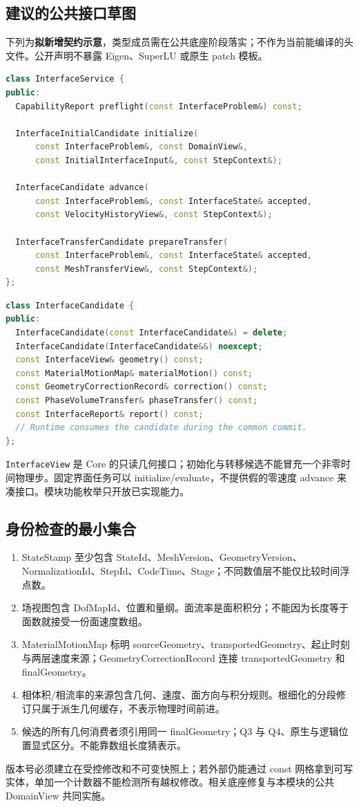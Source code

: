 \documentclass[UTF8,a4paper,11pt,fontset=fandol]{ctexart}
\newcommand{\code}[1]{\nolinkurl{#1}}
\begin{document}
\subsection{建议的公共接口草图}
下列为\textbf{拟新增契约示意}，类型成员需在公共底座阶段落实；不作为当前能编译的头文件。公开声明不暴露 Eigen、SuperLU 或原生 patch 模板。
\begin{lstlisting}[language=C++]
class InterfaceService {
public:
  CapabilityReport preflight(const InterfaceProblem&) const;

  InterfaceInitialCandidate initialize(
      const InterfaceProblem&, const DomainView&,
      const InitialInterfaceInput&, const StepContext&);

  InterfaceCandidate advance(
      const InterfaceProblem&, const InterfaceState& accepted,
      const VelocityHistoryView&, const StepContext&);

  InterfaceTransferCandidate prepareTransfer(
      const InterfaceProblem&, const InterfaceState& accepted,
      const MeshTransferView&, const StepContext&);
};
\end{lstlisting}
\begin{lstlisting}[language=C++]
class InterfaceCandidate {
public:
  InterfaceCandidate(const InterfaceCandidate&) = delete;
  InterfaceCandidate(InterfaceCandidate&&) noexcept;
  const InterfaceView& geometry() const;
  const MaterialMotionMap& materialMotion() const;
  const GeometryCorrectionRecord& correction() const;
  const PhaseVolumeTransfer& phaseTransfer() const;
  const InterfaceReport& report() const;
  // Runtime consumes the candidate during the common commit.
};
\end{lstlisting}
\code{InterfaceView} 是 Core 的只读几何接口；初始化与转移候选不能冒充一个非零时间物理步。固定界面任务可以 initialize/evaluate，不提供假的零速度 advance 来凑接口。模块功能枚举只开放已实现能力。

\subsection{身份检查的最小集合}
\begin{enumerate}
\item StateStamp 至少包含 StateId、MeshVersion、GeometryVersion、NormalizationId、StepId、CodeTime、Stage；不同数值层不能仅比较时间浮点数。
\item 场视图包含 DofMapId、位置和量纲。面流率是面积积分；不能因为长度等于面数就接受一份面速度数组。
\item MaterialMotionMap 标明 sourceGeometry、transportedGeometry、起止时刻与两层速度来源；GeometryCorrectionRecord 连接 transportedGeometry 和 finalGeometry。
\item 相体积/相流率的来源包含几何、速度、面方向与积分规则。根细化的分段修订只属于派生几何缓存，不表示物理时间前进。
\item 候选的所有几何消费者须引用同一 finalGeometry；Q3 与 Q4、原生与逻辑位置显式区分。不能靠数组长度猜表示。
\end{enumerate}
版本号必须建立在受控修改和不可变快照上；若外部仍能通过 const 网格拿到可写实体，单加一个计数器不能检测所有越权修改。相关底座修复与本模块的公共 DomainView 共同实施。
\end{document}
